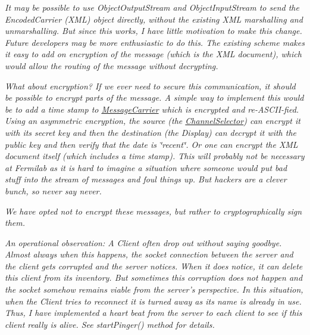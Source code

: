 {\itshape }

{\itshape }

{\itshape  It may be possible to use Object\-Output\-Stream and Object\-Input\-Stream to send the Encoded\-Carrier (X\-M\-L) object directly, without the existing X\-M\-L marshalling and unmarshalling. But since this works, I have little motivation to make this change. Future developers may be more enthusiastic to do this. The existing scheme makes it easy to add on encryption of the message (which is the X\-M\-L document), which would allow the routing of the message without decrypting. }

{\itshape }

{\itshape }

{\itshape  What about encryption? If we ever need to secure this communication, it should be possible to encrypt parts of the message. A simple way to implement this would be to add a time stamp to \hyperlink{classgov_1_1fnal_1_1ppd_1_1dd_1_1chat_1_1MessageCarrier}{Message\-Carrier} which is encrypted and re-\/\-A\-S\-C\-I\-I-\/fied. Using an asymmetric encryption, the source (the \hyperlink{classgov_1_1fnal_1_1ppd_1_1dd_1_1ChannelSelector}{Channel\-Selector}) can encrypt it with its secret key and then the destination (the Display) can decrypt it with the public key and then verify that the date is \char`\"{}recent\char`\"{}. Or one can encrypt the X\-M\-L document itself (which includes a time stamp). This will probably not be necessary at Fermilab as it is hard to imagine a situation where someone would put bad stuff into the stream of messages and foul things up. But hackers are a clever bunch, so never say never. }

{\itshape  }

{\itshape  We have opted not to encrypt these messages, but rather to cryptographically sign them. }

{\itshape  }

{\itshape  An operational observation\-: A Client often drop out without saying goodbye. Almost always when this happens, the socket connection between the server and the client gets corrupted and the server notices. When it does notice, it can delete this client from its inventory. But sometimes this corruption does not happen and the socket somehow remains viable from the server's perspective. In this situation, when the Client tries to reconnect it is turned away as its name is already in use. Thus, I have implemented a heart beat from the server to each client to see if this client really is alive. See start\-Pinger() method for details. }

